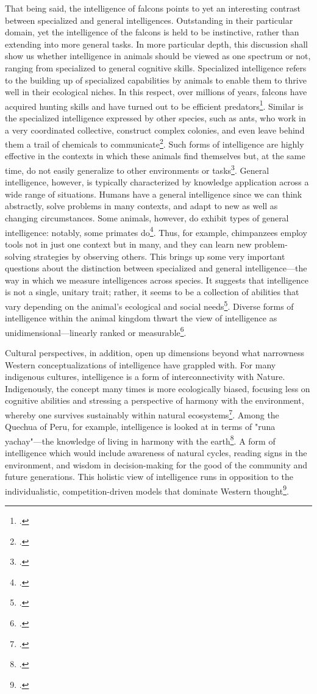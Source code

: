 \documentclass[12pt]{article}
\begin{document}
That being said, the intelligence of falcons points to yet an interesting contrast between specialized and general intelligences. Outstanding in their particular domain, yet the intelligence of the falcons is held to be instinctive, rather than extending into more general tasks. In more particular depth, this discussion shall show us whether intelligence in animals should be viewed as one spectrum or not, ranging from specialized to general cognitive skills. Specialized intelligence refers to the building up of specialized capabilities by animals to enable them to thrive well in their ecological niches. In this respect, over millions of years, falcons have acquired hunting skills and have turned out to be efficient predators\footcite{tucker2000gliding}. Similar is the specialized intelligence expressed by other species, such as ants, who work in a very coordinated collective, construct complex colonies, and even leave behind them a trail of chemicals to communicate\footcite{wilson2000sociobiology}. Such forms of intelligence are highly effective in the contexts in which these animals find themselves but, at the same time, do not easily generalize to other environments or tasks\footcite{shettleworth2010cognition}. General intelligence, however, is typically characterized by knowledge application across a wide range of situations. Humans have a general intelligence since we can think abstractly, solve problems in many contexts, and adapt to new as well as changing circumstances. Some animals, however, do exhibit types of general intelligence: notably, some primates do\footcite{dewaal2016are}. Thus, for example, chimpanzees employ tools not in just one context but in many, and they can learn new problem-solving strategies by observing others. This brings up some very important questions about the distinction between specialized and general intelligence—the way in which we measure intelligences across species. It suggests that intelligence is not a single, unitary trait; rather, it seems to be a collection of abilities that vary depending on the animal's ecological and social needs\footcite{emery2004cognitive}. Diverse forms of intelligence within the animal kingdom thwart the view of intelligence as unidimensional—linearly ranked or measurable\footcite{dewaal2016are}.

Cultural perspectives, in addition, open up dimensions beyond what narrowness Western conceptualizations of intelligence have grappled with. For many indigenous cultures, intelligence is a form of interconnectivity with Nature. Indigenously, the concept many times is more ecologically biased, focusing less on cognitive abilities and stressing a perspective of harmony with the environment, whereby one survives sustainably within natural ecosystems\footcite{berkes2012sacred}. Among the Quechua of Peru, for example, intelligence is looked at in terms of "runa yachay"—the knowledge of living in harmony with the earth\footcite{berkes2012sacred}. A form of intelligence which would include awareness of natural cycles, reading signs in the environment, and wisdom in decision-making for the good of the community and future generations. This holistic view of intelligence runs in opposition to the individualistic, competition-driven models that dominate Western thought\footcite{sternberg2004wisdom}.
\end{document}
